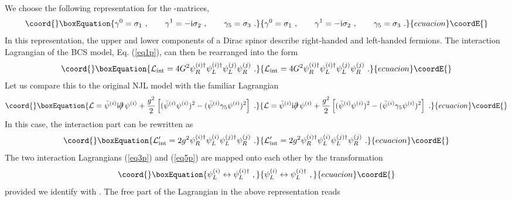 \documentclass[a4paper,twocolumn,aps]{revtex4}
\begin{document}
We choose the following representation for the \myHighlight{$\gamma$}\coordHE{}-matrices,
\begin{equation}\coord{}\boxEquation{
\gamma^0 = \sigma_1 \ , \qquad \gamma^1 = - {\rm i} \sigma_2 \ , \qquad \gamma_5 = \sigma_3 \ .
\label{eq2p}
}{
\gamma^0 = \sigma_1 \ , \qquad \gamma^1 = - {\rm i} \sigma_2 \ , \qquad \gamma_5 = \sigma_3 \ .
}{ecuacion}\coordE{}\end{equation}
In this representation, the upper and lower components of a Dirac spinor describe right-handed
and left-handed fermions. The interaction Lagrangian of the BCS\coordHE{} model, Eq. (\ref{eq1p}),
can then be rearranged into the form
\begin{equation}\coord{}\boxEquation{
{\cal L}_{\rm int} = 4 G^2 \psi_R^{(i)\dagger} \psi_L^{(i)\dagger} \psi_L^{(j)} \psi_R^{(j)} \ .
\label{eq3p}
}{
{\cal L}_{\rm int} = 4 G^2 \psi_R^{(i)\dagger} \psi_L^{(i)\dagger} \psi_L^{(j)} \psi_R^{(j)} \ .
}{ecuacion}\coordE{}\end{equation}
Let us compare this to the original NJL\coordHE{} model \cite{R2} with the familiar Lagrangian
\begin{equation}\coord{}\boxEquation{
{\cal L}= \bar{\psi}^{(i)} {\rm i} \partial \!\!\!/ \, \psi^{(i)} +
\frac{g^2}{2}\left[ (\bar{\psi}^{(i)}\psi^{(i)})^2- (\bar{\psi}^{(i)} \gamma_5 \psi^{(i)})^2 \right] \ .
\label{eq4p}
}{
{\cal L}= \bar{\psi}^{(i)} {\rm i} \partial \!\!\!/ \, \psi^{(i)} +
\frac{g^2}{2}\left[ (\bar{\psi}^{(i)}\psi^{(i)})^2- (\bar{\psi}^{(i)} \gamma_5 \psi^{(i)})^2 \right] \ .
}{ecuacion}\coordE{}\end{equation}
In this case, the interaction part can be rewritten as 
\begin{equation}\coord{}\boxEquation{
{\cal L}_{\rm int}' = 2 g^2 \psi_R^{(i)\dagger} \psi_L^{(i)} \psi_L^{(j)\dagger} \psi_R^{(j)} \ .
\label{eq5p}
}{
{\cal L}_{\rm int}' = 2 g^2 \psi_R^{(i)\dagger} \psi_L^{(i)} \psi_L^{(j)\dagger} \psi_R^{(j)} \ .
}{ecuacion}\coordE{}\end{equation}
The two interaction Lagrangians (\ref{eq3p}) and (\ref{eq5p}) are mapped onto
each other by the transformation
\begin{equation}\coord{}\boxEquation{
\psi_L^{(i)} \leftrightarrow \psi_L^{(i)\dagger} \ ,
\label{eq6p}
}{
\psi_L^{(i)} \leftrightarrow \psi_L^{(i)\dagger} \ ,
}{ecuacion}\coordE{}\end{equation}
provided we identify \coordHE{} with \coordHE{}.
The free part of the Lagrangian in the above representation reads
\end{document}
